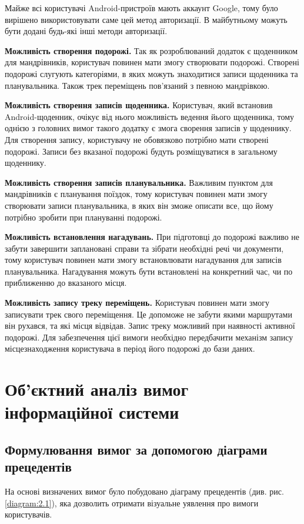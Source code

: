\documentclass[../main.tex]{subfiles}
\begin{document}
Майже всі користувачі Android-пристроїв мають аккаунт Google, тому було вирішено використовувати саме цей метод авторизації. В майбутньому можуть бути додані будь-які інші методи авторизації.

{\bfseries{Можливість створення подорожі.}}
Так як розроблюваний додаток є щоденником для мандрівників, користувач повинен мати змогу створювати подорожі. Створені подорожі слугують категоріями, в яких можуть знаходитися записи щоденника та планувальника. Також трек переміщень пов'язаний з певною мандрівкою.

{\bfseries{Можливість створення записів щоденника.}}
Користувач, який встановив Android-щоденник, очікує від нього можливість ведення йього щоденника, тому однією з головних вимог такого додатку є змога сворення записів у щоденнику. Для створення запису, користувачу не обовязково потрібно мати створені подорожі. Записи без вказаної подорожі будуть розміщуватися в загальному щоденнику.

{\bfseries{Можливість створення записів планувальника.}}
Важливим пунктом для мандрівників є планування поїздок, тому користувач повинен мати змогу створювати записи планувальника, в яких він зможе описати все, що йому потрібно зробити при плануванні подорожі.

{\bfseries{Можливість встановлення нагадувань.}}
При підготовці до подорожі важливо не забути завершити заплановані справи та зібрати необхідні речі чи документи, тому користувач повинен мати змогу встановлювати нагадування для записів планувальника. Нагадування можуть бути встановлені на конкретний час, чи по приближенню до вказаного місця.

{\bfseries{Можливість запису треку переміщень.}}
Користувач повинен мати змогу записувати трек свого переміщення. Це допоможе не забути якими маршрутами він рухався, та  які місця відвідав. Запис треку можливий при наявності активної подорожі. Для забезпечення цієї вимоги необхідно передбачити механізм запису місцезнаходження користувача в період його подорожі до бази даних.

\section{Об'єктний аналіз вимог інформаційної системи}

\subsection{Формулювання вимог за допомогою діаграми прецедентів}
На основі визначених вимог було побудовано діаграму прецедентів (див. рис. \ref{diagram:2.1}), яка дозволить отримати візуальне уявлення про вимоги користувачів.
\end{document}
